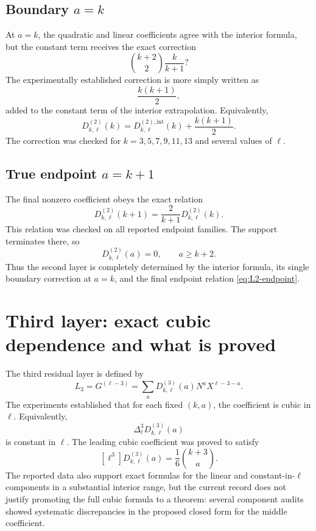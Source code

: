 \documentclass[11pt]{article}
\theoremstyle{remark}
\newcommand{\C}{\binom}
\newcommand{\Lthree}{L_3}
\begin{document}
\subsection{Boundary \(a=k\)}

At \(a=k\), the quadratic and linear coefficients agree with the interior formula,
but the constant term receives the exact correction
\[
    \boxed{\binom{k+2}{2}\frac{k}{k+1}?}
\]
The experimentally established correction is more simply written as
\begin{equation}
    \boxed{\frac{k(k+1)}2},
\label{eq:L2-correction}
\end{equation}
added to the constant term of the interior extrapolation.  Equivalently,
\[
    D^{(2)}_{k,\ell}(k)
    =D^{(2),\mathrm{int}}_{k,\ell}(k)+\frac{k(k+1)}2.
\]
The correction was checked for \(k=3,5,7,9,11,13\) and several values of \(\ell\).

\subsection{True endpoint \(a=k+1\)}

The final nonzero coefficient obeys the exact relation
\begin{equation}
    \boxed{
    D^{(2)}_{k,\ell}(k+1)
    =\frac{2}{k+1}D^{(2)}_{k,\ell}(k).
    }
\label{eq:L2-endpoint}
\end{equation}
This relation was checked on all reported endpoint families.  The support terminates
there, so
\[
    D^{(2)}_{k,\ell}(a)=0,
    \qquad a\ge k+2.
\]
Thus the second layer is completely determined by the interior formula, its single
boundary correction at \(a=k\), and the final endpoint relation \eqref{eq:L2-endpoint}.

\section{Third layer: exact cubic dependence and what is proved}

The third residual layer is defined by
\[
    \Lthree
    =G^{(\ell-3)}
    =\sum_a D^{(3)}_{k,\ell}(a)N^aX^{\ell-3-a}.
\]
The experiments established that for each fixed \((k,a)\), the coefficient is cubic
in \(\ell\).  Equivalently,
\[
    \Delta_{\ell}^3D^{(3)}_{k,\ell}(a)
\]
is constant in \(\ell\).  The leading cubic coefficient was proved to satisfy
\begin{equation}
\boxed{
    [\ell^3]D^{(3)}_{k,\ell}(a)
    =\frac16\C{k+3}{a}.
}
\label{eq:L3-A}
\end{equation}
The reported data also support exact formulas for the linear and constant-in-\(\ell\) components in a substantial interior range, but the current record does not
justify promoting the full cubic formula to a theorem: several component audits
showed systematic discrepancies in the proposed closed form for the middle
coefficient.
\end{document}
